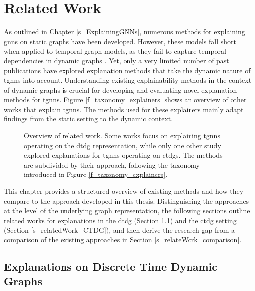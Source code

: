 \section{Related Work}
\label{s_RelatedWork}


As outlined in Chapter \ref{s_ExplainingGNNs}, numerous methods for explaining \glspl{gnn} on static graphs have been developed. However, these models fall short when applied to temporal graph models, as they fail to capture temporal dependencies in dynamic graphs \cite{xia_explaining_2023, he_explainer_2022}. Yet, only a very limited number of past publications have explored explanation methods that take the dynamic nature of \glspl{tgnn} into account. Understanding existing explainability methods in the context of dynamic graphs is crucial for developing and evaluating novel explanation methods for \glspl{tgnn}. Figure \ref{f_taxonomy_explainers} shows an overview of other works that explain \glspl{tgnn}. The methods used for these explainers mainly adapt findings from the static setting to the dynamic context. 

\begin{figure}[ht]
    \centering
    
    \label{f_relatedWork_taxonomy}
    \caption{Overview of related work. Some works focus on explaining \glspl{tgnn} operating on the \gls{dtdg} representation, while only one other study explored explanations for \glspl{tgnn} operating on \glspl{ctdg}. The methods are subdivided by their approach, following the taxonomy introduced in Figure \ref{f_taxonomy_explainers}.}
\end{figure}

This chapter provides a structured overview of existing methods and how they compare to the approach developed in this thesis. Distinguishing the approaches at the level of the underlying graph representation, the following sections outline related works for explanations in the \gls{dtdg} (Section \ref{s_relatedWork_DTDG}) and the \gls{ctdg} setting (Section \ref{s_relatedWork_CTDG}), and then derive the research gap from a comparison of the existing approaches in Section \ref{s_relateWork_comparison}.

\subsection{Explanations on Discrete Time Dynamic Graphs}
\label{s_relatedWork_DTDG}

